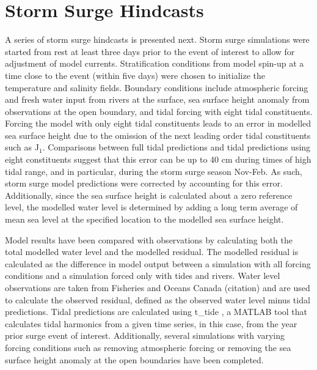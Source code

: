 \documentclass[pdftex,10pt]{article}
\begin{document}
\section{Storm Surge Hindcasts}\label{sec:storm}
A series of storm surge hindcasts is presented next. Storm surge simulations were started from rest at least three days prior to the event of interest to allow for adjustment of model currents. Stratification conditions from model spin-up at a time close to the event (within five days) were chosen to initialize the temperature and salinity fields. Boundary conditions include atmospheric forcing and fresh water input from rivers at the surface, sea surface height anomaly from observations at the open boundary, and tidal forcing with eight tidal constituents. Forcing the model with only eight tidal constituents leads to an error in modelled sea surface height due to the omission of the next leading order tidal constituents such as J$_1$. Comparisons between full tidal predictions and tidal predictions using eight constituents suggest that this error can be up to 40 cm during times of high tidal range, and in particular, during the storm surge season Nov-Feb. As such, storm surge model predictions were corrected by accounting for this error. Additionally, since the sea surface height is calculated about a zero reference level, the modelled water level is determined by adding a long term average of mean sea level at the specified location to the modelled sea surface height.

Model results have been compared with observations by calculating both the total modelled water level and the modelled residual. The modelled residual is calculated as the difference in model output between a simulation with all forcing conditions and a simulation forced only with tides and rivers. Water level observations are taken from Fisheries and Oceans Canada (citation) and are used to calculate the observed residual, defined as the observed water level minus tidal predictions. Tidal predictions are calculated using t\_tide \citep{pawlowicz2002classical}, a MATLAB tool that calculates tidal harmonics from a given time series, in this case, from the year prior surge event of interest. Additionally, several simulations with varying forcing conditions such as removing atmospheric forcing or removing the sea surface height anomaly at the open boundaries have been completed. 
\end{document}
